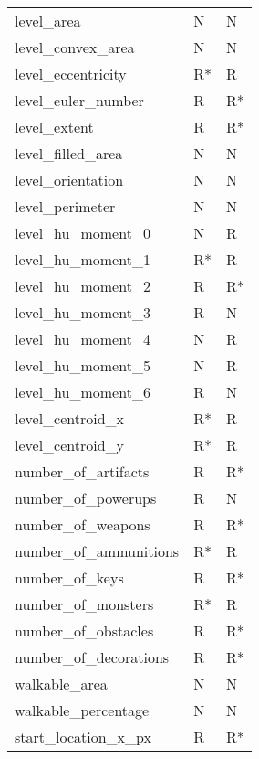 \begin{longtable}{lll}
	\bottomrule
	\endlastfoot
	level\_area                    &      N &    N \\
	level\_convex\_area             &      N &    N \\
	level\_eccentricity            &     R* &    R \\
	level\_euler\_number            &      R &   R* \\
	level\_extent                  &      R &   R* \\
	level\_filled\_area             &      N &    N \\
	level\_orientation             &      N &    N \\
	level\_perimeter               &      N &    N \\
	level\_hu\_moment\_0             &      N &    R \\
	level\_hu\_moment\_1             &     R* &    R \\
	level\_hu\_moment\_2             &      R &   R* \\
	level\_hu\_moment\_3             &      R &    N \\
	level\_hu\_moment\_4             &      N &    R \\
	level\_hu\_moment\_5             &      N &    R \\
	level\_hu\_moment\_6             &      R &    N \\
	level\_centroid\_x              &     R* &    R \\
	level\_centroid\_y              &     R* &    R \\
	number\_of\_artifacts           &      R &   R* \\
	number\_of\_powerups            &      R &    N \\
	number\_of\_weapons             &      R &   R* \\
	number\_of\_ammunitions         &     R* &    R \\
	number\_of\_keys                &      R &   R* \\
	number\_of\_monsters            &     R* &    R \\
	number\_of\_obstacles           &      R &   R* \\
	number\_of\_decorations         &      R &   R* \\
	walkable\_area                 &      N &    N \\
	walkable\_percentage           &      N &    N \\
	start\_location\_x\_px           &      R &   R* \\

\end{longtable}
